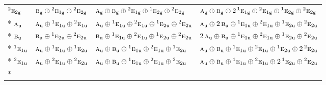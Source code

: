 \documentclass[10pt,a4paper]{article}
\numberwithin{equation}{section}
\newcommand{\irr}[1]{\text{\normalfont\scshape #1}}
\newcommand{\conjpair}[1]{{}^{#1}}
\newcommand{\ptag}[1]{\mathrm{#1}}
\begin{document}
{\begin{longtable}{@{}llll@{}}
$\conjpair{2}\irr{e}_{2\ptag{g}}$ & $\irr{b}_{\ptag{g}}\oplus \conjpair{2}\irr{e}_{1\ptag{g}}\oplus \conjpair{2}\irr{e}_{2\ptag{g}}$ & $\irr{a}_{\ptag{g}}\oplus \irr{b}_{\ptag{g}}\oplus \conjpair{2}\irr{e}_{1\ptag{g}}\oplus \conjpair{1}\irr{e}_{2\ptag{g}}\oplus \conjpair{2}\irr{e}_{2\ptag{g}}$ & $\irr{a}_{\ptag{g}}\oplus \irr{b}_{\ptag{g}}\oplus 2\,\conjpair{1}\irr{e}_{1\ptag{g}}\oplus \conjpair{2}\irr{e}_{1\ptag{g}}\oplus \conjpair{1}\irr{e}_{2\ptag{g}}\oplus \conjpair{2}\irr{e}_{2\ptag{g}}$\\*
$\irr{a}_{\ptag{u}}$ & $\irr{a}_{\ptag{u}}\oplus \conjpair{1}\irr{e}_{1\ptag{u}}\oplus \conjpair{2}\irr{e}_{1\ptag{u}}$ & $\irr{a}_{\ptag{u}}\oplus \conjpair{1}\irr{e}_{1\ptag{u}}\oplus \conjpair{2}\irr{e}_{1\ptag{u}}\oplus \conjpair{1}\irr{e}_{2\ptag{u}}\oplus \conjpair{2}\irr{e}_{2\ptag{u}}$ & $\irr{a}_{\ptag{u}}\oplus 2\,\irr{b}_{\ptag{u}}\oplus \conjpair{1}\irr{e}_{1\ptag{u}}\oplus \conjpair{2}\irr{e}_{1\ptag{u}}\oplus \conjpair{1}\irr{e}_{2\ptag{u}}\oplus \conjpair{2}\irr{e}_{2\ptag{u}}$\\*
$\irr{b}_{\ptag{u}}$ & $\irr{b}_{\ptag{u}}\oplus \conjpair{1}\irr{e}_{2\ptag{u}}\oplus \conjpair{2}\irr{e}_{2\ptag{u}}$ & $\irr{b}_{\ptag{u}}\oplus \conjpair{1}\irr{e}_{1\ptag{u}}\oplus \conjpair{2}\irr{e}_{1\ptag{u}}\oplus \conjpair{1}\irr{e}_{2\ptag{u}}\oplus \conjpair{2}\irr{e}_{2\ptag{u}}$ & $2\,\irr{a}_{\ptag{u}}\oplus \irr{b}_{\ptag{u}}\oplus \conjpair{1}\irr{e}_{1\ptag{u}}\oplus \conjpair{2}\irr{e}_{1\ptag{u}}\oplus \conjpair{1}\irr{e}_{2\ptag{u}}\oplus \conjpair{2}\irr{e}_{2\ptag{u}}$\\*
$\conjpair{1}\irr{e}_{1\ptag{u}}$ & $\irr{a}_{\ptag{u}}\oplus \conjpair{1}\irr{e}_{1\ptag{u}}\oplus \conjpair{1}\irr{e}_{2\ptag{u}}$ & $\irr{a}_{\ptag{u}}\oplus \irr{b}_{\ptag{u}}\oplus \conjpair{1}\irr{e}_{1\ptag{u}}\oplus \conjpair{2}\irr{e}_{1\ptag{u}}\oplus \conjpair{1}\irr{e}_{2\ptag{u}}$ & $\irr{a}_{\ptag{u}}\oplus \irr{b}_{\ptag{u}}\oplus \conjpair{1}\irr{e}_{1\ptag{u}}\oplus \conjpair{2}\irr{e}_{1\ptag{u}}\oplus \conjpair{1}\irr{e}_{2\ptag{u}}\oplus 2\,\conjpair{2}\irr{e}_{2\ptag{u}}$\\*
$\conjpair{2}\irr{e}_{1\ptag{u}}$ & $\irr{a}_{\ptag{u}}\oplus \conjpair{2}\irr{e}_{1\ptag{u}}\oplus \conjpair{2}\irr{e}_{2\ptag{u}}$ & $\irr{a}_{\ptag{u}}\oplus \irr{b}_{\ptag{u}}\oplus \conjpair{1}\irr{e}_{1\ptag{u}}\oplus \conjpair{2}\irr{e}_{1\ptag{u}}\oplus \conjpair{2}\irr{e}_{2\ptag{u}}$ & $\irr{a}_{\ptag{u}}\oplus \irr{b}_{\ptag{u}}\oplus \conjpair{1}\irr{e}_{1\ptag{u}}\oplus \conjpair{2}\irr{e}_{1\ptag{u}}\oplus 2\,\conjpair{1}\irr{e}_{2\ptag{u}}\oplus \conjpair{2}\irr{e}_{2\ptag{u}}$\\*

\end{longtable}}
\end{document}
